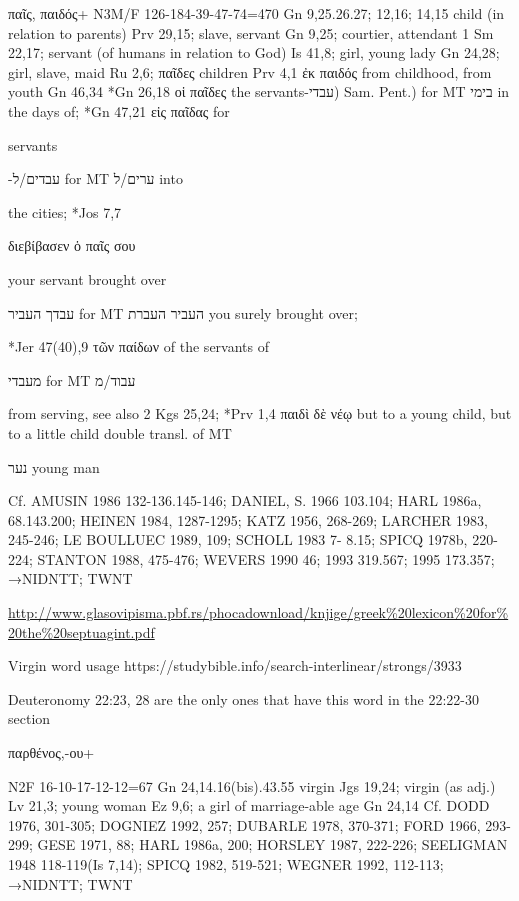 \documentclass[11pt]{article}
\begin{document}
{\begin{greek} παῖς, παιδός+ N3M/F 126-184-39-47-74=470
Gn 9,25.26.27; 12,16; 14,15
child (in relation to parents) Prv 29,15; slave, servant Gn 9,25; courtier, attendant 1 Sm 22,17; servant
(of humans in relation to God) Is 41,8; girl, young lady Gn 24,28; girl, slave, maid Ru 2,6; παῖδες
children Prv 4,1
ἐκ παιδός from childhood, from youth Gn 46,34
*Gn 26,18 οἱ παῖδες the servants-עבדי) Sam. Pent.) for MT בימי in the days of; *Gn 47,21 εἰς παῖδας for \end{greek}
servants\begin{hebrew} -עבדים/ל for MT ערים/ל into \end{hebrew} the cities; *Jos 7,7 \begin{greek} διεβίβασεν ὁ παῖς σου \end{greek} your servant brought over
\begin{hebrew}
 עבדך
העביר for MT העביר העברת you surely brought over; 
 \end{hebrew}
\begin{greek}  *Jer 47(40),9 τῶν παίδων of the servants of \end{greek}
\begin{hebrew}
  מעבדי
for MT עבוד/מ 
\end{hebrew}
\begin{greek}
from serving, see also 2 Kgs 25,24; *Prv 1,4 παιδὶ δὲ νέῳ but to a young child, but to
a little child double transl. of MT
\end{greek}
\begin{hebrew}
 נער young man
\end{hebrew}
Cf. AMUSIN 1986 132-136.145-146; DANIEL, S. 1966 103.104; HARL 1986a, 68.143.200; HEINEN 1984,
1287-1295; KATZ 1956, 268-269; LARCHER 1983, 245-246; LE BOULLUEC 1989, 109; SCHOLL 1983 7-
8.15; SPICQ 1978b, 220-224; STANTON 1988, 475-476; WEVERS 1990 46; 1993 319.567; 1995 173.357;
→NIDNTT; TWNT 

\url{http://www.glasovipisma.pbf.rs/phocadownload/knjige/greek%20lexicon%20for%20the%20septuagint.pdf}



Virgin word usage https://studybible.info/search-interlinear/strongs/3933

 Deuteronomy 22:23, 28 are the only ones that have this word in the 22:22-30 section

\begin{greek}
παρθένος,-ου+ \end{greek} N2F 16-10-17-12-12=67
Gn 24,14.16(bis).43.55
virgin Jgs 19,24; virgin (as adj.) Lv 21,3; young woman Ez 9,6; a girl of marriage-able age Gn 24,14
Cf. DODD 1976, 301-305; DOGNIEZ 1992, 257; DUBARLE 1978, 370-371; FORD 1966, 293-299; GESE
1971, 88; HARL 1986a, 200; HORSLEY 1987, 222-226; SEELIGMAN 1948 118-119(Is 7,14); SPICQ 1982,
519-521; WEGNER 1992, 112-113; →NIDNTT; TWNT



}
\end{document}
